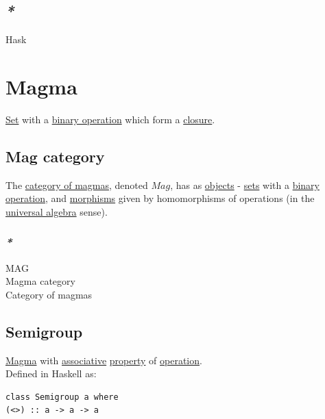 \documentclass[a4paper,14pt,oneside]{book}
\begin{document}
\subsection{\emph{*}}
\label{sec:orgf9033da}

\label{orgb78470d}Hask\\

\section{\label{orge39d07e}Magma}
\label{sec:org37506db}
\hyperref[orge119629]{Set} with a \hyperref[orge2fb74d]{binary operation} which form a \hyperref[org0c0e277]{closure}.\\

\subsection{\label{org8f1812a}Mag category}
\label{sec:org36349ab}
The \hyperref[org55d84a8]{category of magmas}, denoted \(Mag\), has as \hyperref[org22f7883]{objects} - \hyperref[org1faae0f]{sets} with a \hyperref[orge2fb74d]{binary operation}, and \hyperref[org9d6b2ec]{morphisms} given by homomorphisms of operations (in the \hyperref[org7419afe]{universal algebra} sense).\\

\subsubsection{\emph{*}}
\label{sec:orge1b4aa7}

\label{org1142df7}MAG\\
\label{org3e691cc}Magma category\\
\label{org55d84a8}Category of magmas\\

\subsection{\label{org7c0368a}Semigroup}
\label{sec:orgf6baf3f}
\hyperref[orge39d07e]{Magma} with \hyperref[org1621588]{associative} \hyperref[org91a1c9f]{property} of \hyperref[org6ed0c27]{operation}.\\

Defined in Haskell as:\\
\begin{verbatim}
class Semigroup a where
(<>) :: a -> a -> a
\end{verbatim}
\end{document}
